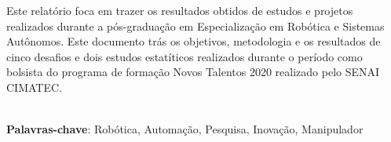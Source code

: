 \begin{thesisresumo}
Este relatório foca em trazer os resultados obtidos de estudos e projetos realizados durante a pós-graduação em Especialização em Robótica e Sistemas Autônomos. Este documento trás os objetivos, metodologia e os resultados de cinco desafios e dois estudos estatíticos realizados durante o período como bolsista do programa de formação Novos Talentos 2020 realizado pelo SENAI CIMATEC.

\ \\


\textbf{Palavras-chave}: Robótica, Automação, Pesquisa, Inovação, Manipulador

\end{thesisresumo}
